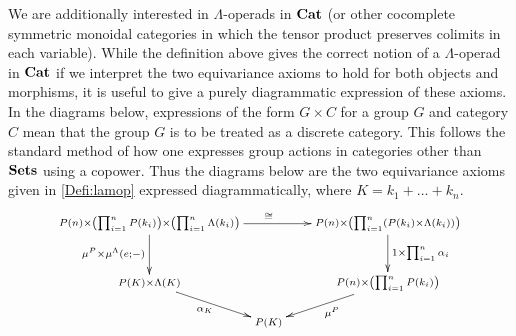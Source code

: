 We are additionally interested in $\Lambda$-operads in $\mathbf{Cat}$ (or other cocomplete symmetric monoidal categories in which the tensor product preserves colimits in each variable). While the definition above gives the correct notion of a $\Lambda$-operad in $\mathbf{Cat}$ if we interpret the two equivariance axioms to hold for both objects and morphisms, it is useful to give a purely diagrammatic expression of these axioms. In the diagrams below, expressions of the form $G \times C$ for a group $G$ and category $C$ mean that the group $G$ is to be treated as a discrete category. This follows the standard method of how one expresses group actions in categories other than $\mathbf{Sets}$ using a copower. Thus the diagrams below are the two equivariance axioms given in \cref{Defi:lamop} expressed diagrammatically, where $K = k_1 + \ldots + k_n$.
  \[
    \xy
      (0,0)*+{\scriptstyle P(n) \times \left(\prod_{i=1}^n P(k_i)\right) \times \left(\prod_{i=1}^n \Lambda(k_i)\right)} ="00";
      (0,-15)*+{\scriptstyle P(K) \times \Lambda(K) } ="01";
      (60,0)*+{\scriptstyle P(n) \times \left(\prod_{i=1}^n \left(P(k_{i}) \times \Lambda(k_{i})\right)\right)} ="20";
      (60,-15)*+{\scriptstyle P(n) \times \left(\prod_{i=1}^n P(k_i)\right) } ="21";
      (30, -25)*+{\scriptstyle P(K) } ="12";%
      {\ar^{\cong} "00" ; "20"};
      {\ar^{1 \times \prod_{i=1}^n \alpha_i} "20" ; "21"};
      {\ar^{\mu^P} "21" ; "12"};
      {\ar_{\mu^P \times \mu^\Lambda(e;-)} "00" ; "01"};
      {\ar_{\alpha_{K}} "01" ; "12"};
    \endxy
  \]
